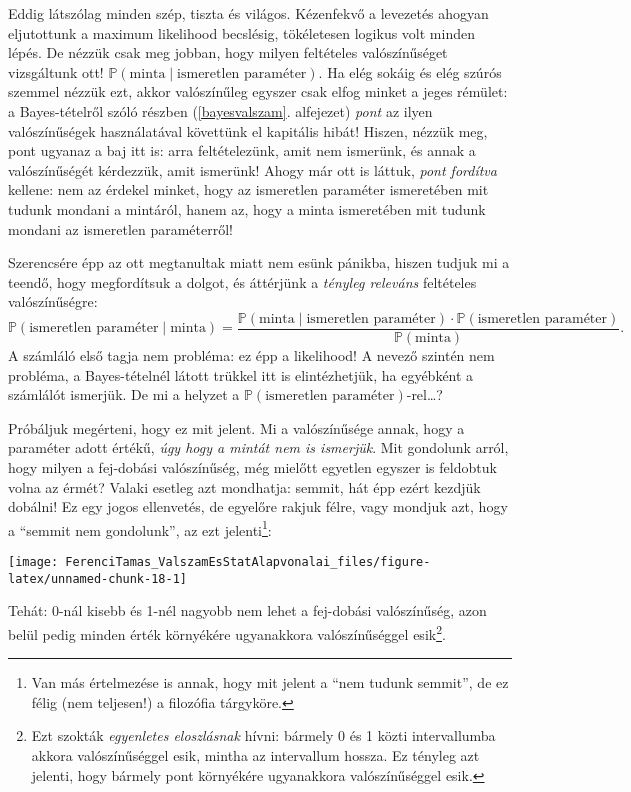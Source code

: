\documentclass[magyar,]{book}
\let\rmarkdownfootnote\footnote%
\def\footnote{\protect\rmarkdownfootnote}
\begin{document}
Eddig látszólag minden szép, tiszta és világos. Kézenfekvő a levezetés ahogyan eljutottunk a maximum likelihood becslésig, tökéletesen logikus volt minden lépés. De nézzük csak meg jobban, hogy milyen feltételes valószínűséget vizsgáltunk ott! \(\mathbb{P}\left(\text{minta}\mid\text{ismeretlen paraméter}\right)\). Ha elég sokáig és elég szúrós szemmel nézzük ezt, akkor valószínűleg egyszer csak elfog minket a jeges rémület: a Bayes-tételről szóló részben (\ref{bayesvalszam}. alfejezet) \emph{pont} az ilyen valószínűségek használatával követtünk el kapitális hibát! Hiszen, nézzük meg, pont ugyanaz a baj itt is: arra feltételezünk, amit nem ismerünk, és annak a valószínűségét kérdezzük, amit ismerünk! Ahogy már ott is láttuk, \emph{pont fordítva} kellene: nem az érdekel minket, hogy az ismeretlen paraméter ismeretében mit tudunk mondani a mintáról, hanem az, hogy a minta ismeretében mit tudunk mondani az ismeretlen paraméterről!

Szerencsére épp az ott megtanultak miatt nem esünk pánikba, hiszen tudjuk mi a teendő, hogy megfordítsuk a dolgot, és áttérjünk a \emph{tényleg releváns} feltételes valószínűségre:
\[
 \mathbb{P}\left(\text{ismeretlen paraméter}\mid\text{minta}\right)=\frac{\mathbb{P}\left(\text{minta}\mid\text{ismeretlen paraméter}\right)\cdot \mathbb{P}\left(\text{ismeretlen paraméter}\right)}{\mathbb{P}\left(\text{minta}\right)}.
\]
A számláló első tagja nem probléma: ez épp a likelihood! A nevező szintén nem probléma, a Bayes-tételnél látott trükkel itt is elintézhetjük, ha egyébként a számlálót ismerjük. De mi a helyzet a \(\mathbb{P}\left(\text{ismeretlen paraméter}\right)\)-rel\ldots?

Próbáljuk megérteni, hogy ez mit jelent. Mi a valószínűsége annak, hogy a paraméter adott értékű, \emph{úgy hogy a mintát nem is ismerjük}. Mit gondolunk arról, hogy milyen a fej-dobási valószínűség, még mielőtt egyetlen egyszer is feldobtuk volna az érmét? Valaki esetleg azt mondhatja: semmit, hát épp ezért kezdjük dobálni! Ez egy jogos ellenvetés, de egyelőre rakjuk félre, vagy mondjuk azt, hogy a \enquote{semmit nem gondolunk}, az ezt jelenti\footnote{Van más értelmezése is annak, hogy mit jelent a \enquote{nem tudunk semmit}, de ez félig (nem teljesen!) a filozófia tárgyköre.}:

\begin{center}\texttt{[image: FerenciTamas\_ValszamEsStatAlapvonalai\_files/figure-latex/unnamed-chunk-18-1]} \end{center}

Tehát: 0-nál kisebb és 1-nél nagyobb nem lehet a fej-dobási valószínűség, azon belül pedig minden érték környékére ugyanakkora valószínűséggel esik\footnote{Ezt szokták \emph{egyenletes eloszlásnak} hívni: bármely 0 és 1 közti intervallumba akkora valószínűséggel esik, mintha az intervallum hossza. Ez tényleg azt jelenti, hogy bármely pont környékére ugyanakkora valószínűséggel esik.}.
\end{document}
